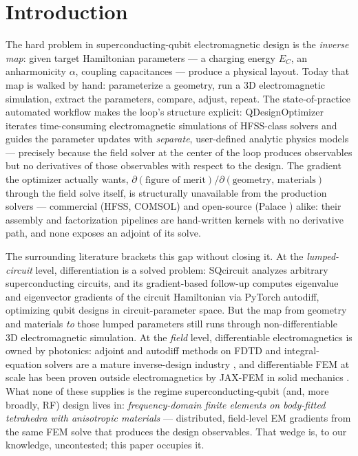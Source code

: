 \documentclass{anvil-paper}
\begin{document}
\section{Introduction}
\label{sec:intro}

The hard problem in superconducting-qubit electromagnetic design is the
\emph{inverse map}: given target Hamiltonian parameters --- a charging
energy $E_C$, an anharmonicity $\alpha$, coupling capacitances --- produce
a physical layout. Today that map is walked by hand: parameterize a
geometry, run a 3D electromagnetic simulation, extract the parameters,
compare, adjust, repeat. The state-of-practice automated workflow makes
the loop's structure explicit: QDesignOptimizer
\citep{eriksson2025automated} iterates time-consuming electromagnetic
simulations of HFSS-class solvers and guides the parameter updates with
\emph{separate}, user-defined analytic physics models --- precisely
because the field solver at the center of the loop produces observables
but no derivatives of those observables with respect to the design. The
gradient the optimizer actually wants, $\partial(\text{figure of
merit})/\partial(\text{geometry, materials})$ through the field solve
itself, is structurally unavailable from the production solvers ---
commercial (HFSS, COMSOL) and open-source (Palace \citep{palace}) alike:
their assembly and factorization pipelines are hand-written kernels with
no derivative path, and none exposes an adjoint of its solve.

The surrounding literature brackets this gap without closing it. At the
\emph{lumped-circuit} level, differentiation is a solved problem:
SQcircuit \citep{rajabzadeh2023analysis} analyzes arbitrary
superconducting circuits, and its gradient-based follow-up
\citep{rajabzadeh2024general} computes eigenvalue and eigenvector
gradients of the circuit Hamiltonian via PyTorch autodiff, optimizing
qubit designs in circuit-parameter space. But the map from geometry and
materials \emph{to} those lumped parameters still runs through
non-differentiable 3D electromagnetic simulation. At the \emph{field}
level, differentiable electromagnetics is owned by photonics: adjoint and
autodiff methods on FDTD and integral-equation solvers are a mature
inverse-design industry \citep{molesky2018inverse,hughes2019forward,
hammond2022high,schubert2022inverse,mahlau2026fdtdx,ponomareva2025torchgdm},
and differentiable FEM at scale has been proven outside electromagnetics
by JAX-FEM in solid mechanics \citep{xue2023jax}. What none of these
supplies is the regime superconducting-qubit (and, more broadly, RF)
design lives in: \emph{frequency-domain finite elements on body-fitted
tetrahedra with anisotropic materials} --- distributed, field-level EM
gradients from the same FEM solve that produces the design observables.
That wedge is, to our knowledge, uncontested; this paper occupies it.
\end{document}

